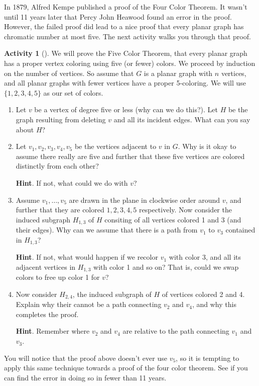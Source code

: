 \documentclass[10pt,]{book}
\theoremstyle{plain}
\theoremstyle{definition}
\theoremstyle{definition}
\theoremstyle{definition}
\newtheorem{activity}[project]{Activity}
\numberwithin{equation}{chapter}
\begin{document}
\hypertarget{p-352}{}%
In 1879, Alfred Kempe published a proof of the Four Color Theorem.  It wasn't until 11 years later that Percy John Heawood found an error in the proof.  However, the failed proof did lead to a nice proof that every planar graph has chromatic number at most five.  The next activity walks you through that proof.%
\begin{activity}[]\label{activity-32}
\hypertarget{p-353}{}%
We will prove the Five Color Theorem, that every planar graph has a proper vertex coloring using five (or fewer) colors.  We proceed by induction on the number of vertices.  So assume that \(G\) is a planar graph with \(n\) vertices, and all planar graphs with fewer vertices have a proper 5-coloring.  We will use \(\{1,2,3,4,5\}\) as our set of colors.%
\begin{enumerate}[font=\bfseries,label=(\alph*),ref=\alph*]
\item\label{task-48} \hypertarget{p-354}{}%
Let \(v\) be a vertex of degree five or less (why can we do this?).  Let \(H\) be the graph resulting from deleting \(v\) and all its incident edges.  What can you say about \(H\)?%
\item\label{task-49} \hypertarget{p-355}{}%
Let \(v_1, v_2, v_3, v_4, v_5\) be the vertices adjacent to \(v\) in \(G\).  Why is it okay to assume there really are five and further that these five vertices are colored distinctly from each other?%
\par\smallskip%
\noindent\textbf{Hint}.\hypertarget{hint-12}{}\quad%
\hypertarget{p-356}{}%
If not, what could we do with \(v\)?%
\item\label{task-50} \hypertarget{p-357}{}%
Assume \(v_1, \ldots, v_5\) are drawn in the plane in clockwise order around \(v\), and further that they are colored \(1,2,3,4,5\) respectively.  Now consider the induced subgraph \(H_{1,3}\) of \(H\) consiting of all vertices colored 1 and 3 (and their edges).  Why can we assume that there is a path from \(v_1\) to \(v_3\) contained in \(H_{1,3}\)?%
\par\smallskip%
\noindent\textbf{Hint}.\hypertarget{hint-13}{}\quad%
\hypertarget{p-358}{}%
If not, what would happen if we recolor \(v_1\) with color 3, and all its adjacent vertices in \(H_{1,3}\) with color 1 and so on?  That is, could we swap colors to free up color 1 for \(v\)?%
\item\label{task-51} \hypertarget{p-359}{}%
Now consider \(H_{2,4}\), the induced subgraph of \(H\) of vertices colored 2 and 4.  Explain why their cannot be a path connecting \(v_2\) and \(v_4\), and why this completes the proof.%
\par\smallskip%
\noindent\textbf{Hint}.\hypertarget{hint-14}{}\quad%
\hypertarget{p-360}{}%
Remember where \(v_2\) and \(v_4\) are relative to the path connecting \(v_1\) and \(v_3\).%
\end{enumerate}
\end{activity}
\hypertarget{p-361}{}%
You will notice that the proof above doesn't ever use \(v_5\), so it is tempting to apply this same technique towards a proof of the four color theorem.  See if you can find the error in doing so in fewer than 11 years.%
\typeout{************************************************}
\typeout{************************************************}
\end{document}
